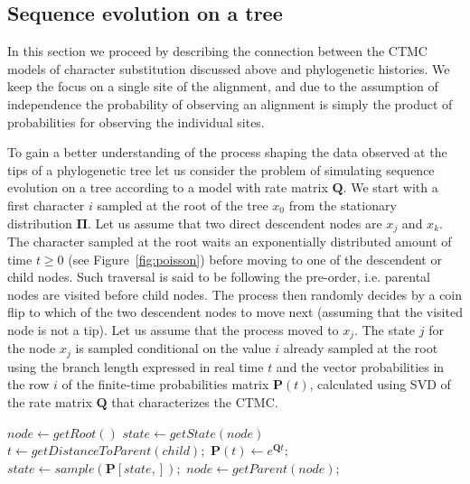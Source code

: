\subsection{Sequence evolution on a tree\label{sub:evolutionOnTree}}

In this section we proceed by describing the connection between the CTMC models of character substitution discussed above and phylogenetic histories.
We keep the focus on a single site of the alignment, and due to the assumption of independence the probability of observing an alignment is simply the product of probabilities for observing the individual sites.

To gain a better understanding of the process shaping the data observed at the tips of a phylogenetic tree let us consider the problem of simulating sequence evolution on a tree according to a model with rate matrix $\mathbf{Q}$.
We start with a first character $i$ sampled at the root of the tree $x_0$ from the stationary distribution $\mathbf{\Pi}$.
Let us assume that two direct descendent nodes are $x_j$ and $x_k$.
The character sampled at the root waits an exponentially distributed amount of time $t\geq0$ (see Figure~\ref{fig:poisson}) before moving to one of the descendent or child nodes.
Such traversal is said to be following the pre-order, i.e. parental nodes are visited before child nodes.   
The process then randomly decides by a coin flip to which of the two descendent nodes to move next (assuming that the visited node is not a tip).
Let us assume that the process moved to $x_j$.
The state $j$ for the node $x_j$ is sampled conditional on the value $i$ already sampled at the root using the branch length expressed in real time $t$ and the vector probabilities in the row $i$ of the finite-time probabilities matrix $\mathbf{P}(t)$, calculated using SVD of the rate matrix $\mathbf{Q}$ that characterizes the CTMC.   

\begin{algorithm}[H]
\centering
\begin{algorithmic}[1]
%
\State $node \gets getRoot\left(\right)$
%
\State $state \gets getState\left(node\right)$
%
\Repeat
%
%
%
\State $t \gets getDistanceToParent\left(child\right);$
%
\State $ \mathbf{P}\left(t\right) \gets e^{\mathbf{Q}t};$
%
\State $state \gets sample\left(\mathbf{P}\left[ state, \right]\right);$
%
\EndFor
%
\Else {}
%
\State $node \gets getParent\left(node\right);$
%
\EndIf
%
\end{algorithmic}
\caption{
{ \footnotesize 
{\bf Pseudo code for simulating an evolutionary process along a phylogeny.} 
When a child node is visited, the state is sampled with conditional probabilities of changing to state $j$ given state $i$ at the parental node.
}%
}
\label{alg:simulation}
\end{algorithm}

